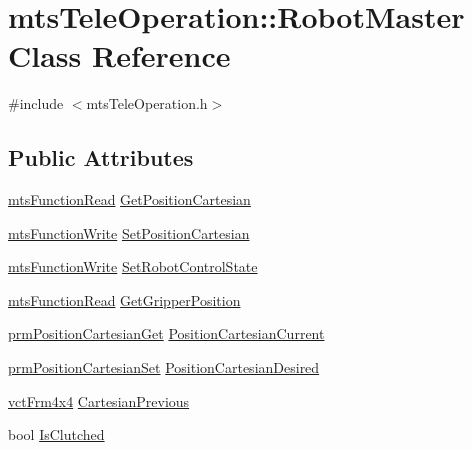 \hypertarget{classmts_tele_operation_1_1_robot_master}{}\section{mts\+Tele\+Operation\+:\+:Robot\+Master Class Reference}
\label{classmts_tele_operation_1_1_robot_master}


{\ttfamily \#include $<$mts\+Tele\+Operation.\+h$>$}

\subsection*{Public Attributes}
\begin{DoxyCompactItemize}
\item 
\hyperlink{classmts_function_read}{mts\+Function\+Read} \hyperlink{classmts_tele_operation_1_1_robot_master_a636208133cb0148316c243a9eb0c7cf0}{Get\+Position\+Cartesian}
\item 
\hyperlink{classmts_function_write}{mts\+Function\+Write} \hyperlink{classmts_tele_operation_1_1_robot_master_aa770b7c1b750b7b2afc350b60581f9b2}{Set\+Position\+Cartesian}
\item 
\hyperlink{classmts_function_write}{mts\+Function\+Write} \hyperlink{classmts_tele_operation_1_1_robot_master_a11e283aec6cec91955b9fc132b6f4bc8}{Set\+Robot\+Control\+State}
\item 
\hyperlink{classmts_function_read}{mts\+Function\+Read} \hyperlink{classmts_tele_operation_1_1_robot_master_ad3791d4ef807b382f9d1f870225d0b65}{Get\+Gripper\+Position}
\item 
\hyperlink{classprm_position_cartesian_get}{prm\+Position\+Cartesian\+Get} \hyperlink{classmts_tele_operation_1_1_robot_master_aa0c188ce05365e7a3a842bb8223eedb5}{Position\+Cartesian\+Current}
\item 
\hyperlink{classprm_position_cartesian_set}{prm\+Position\+Cartesian\+Set} \hyperlink{classmts_tele_operation_1_1_robot_master_a5c1d1ecf363197b5e16e766e186f0273}{Position\+Cartesian\+Desired}
\item 
\hyperlink{vct_transformation_types_8h_a33da47f4deb2556b37a69a2c44b29d75}{vct\+Frm4x4} \hyperlink{classmts_tele_operation_1_1_robot_master_a64a8bdf7b6dc8b6b1dd2ba6eec9fccdf}{Cartesian\+Previous}
\item 
bool \hyperlink{classmts_tele_operation_1_1_robot_master_a5ab0c4355af46b27e084c7e0b9915058}{Is\+Clutched}
\end{DoxyCompactItemize}


